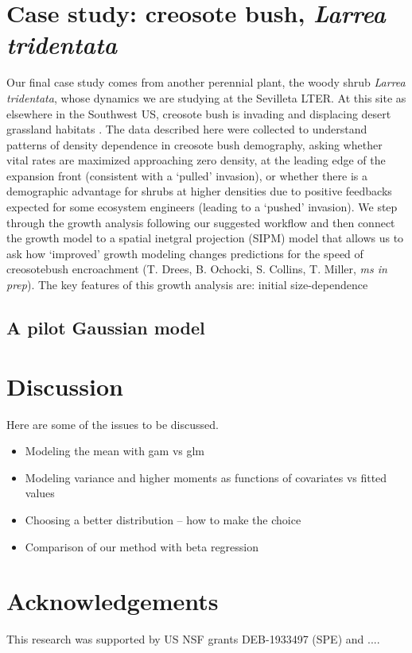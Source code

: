 \documentclass[11pt]{article}
\begin{document}
{\section{Case study: creosote bush, \emph{Larrea tridentata}}
Our final case study comes from another perennial plant, the woody shrub \emph{Larrea tridentata}, whose dynamics we are studying at the Sevilleta LTER. 
At this site as elsewhere in the Southwest US, creosote bush is invading and displacing desert grassland habitats \citep{}.
The data described here were collected to understand patterns of density dependence in creosote bush demography, asking whether vital rates are maximized approaching zero density, at the leading edge of the expansion front (consistent with a `pulled' invasion), or whether there is a demographic advantage for shrubs at higher densities due to positive feedbacks expected for some ecosystem engineers (leading to a `pushed' invasion). 
We step through the growth analysis following our suggested workflow and then connect the growth model to a spatial inetgral projection (SIPM)  model that allows us to ask how `improved' growth modeling changes predictions for the speed of creosotebush encroachment (T. Drees, B. Ochocki, S. Collins, T. Miller, \textit{ms in prep}). 
The key features of this growth analysis are: initial size-dependence 

\subsection{A pilot Gaussian model}


\section{Discussion}

Here are some of the issues to be discussed.
\begin{itemize}
\item{Modeling the mean with gam vs glm}
\item{Modeling variance and higher moments as functions of covariates vs fitted values}
\item{Choosing a better distribution -- how to make the choice}
\item{Comparison of our method with beta regression}

\end{itemize}

\section*{Acknowledgements} 
This research was supported by US NSF grants DEB-1933497 (SPE) and .... 

}
\end{document}
